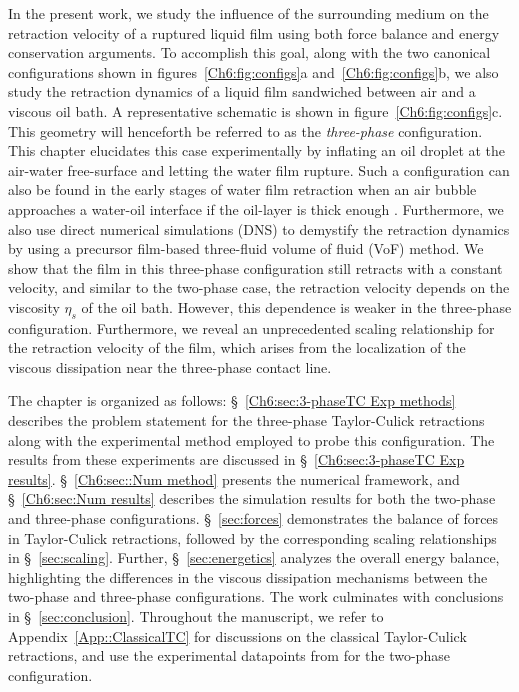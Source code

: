 In the present work, we study the influence of the surrounding medium on the retraction velocity of a ruptured liquid film using both force balance and energy conservation arguments. To accomplish this goal, along with the two canonical configurations shown in figures~\ref{Ch6:fig:configs}a and~\ref{Ch6:fig:configs}b, we also study the retraction dynamics of a liquid film sandwiched between air and a viscous oil bath. A representative schematic is shown in figure~\ref{Ch6:fig:configs}c. This geometry will henceforth be referred to as the \emph{three-phase} configuration. This chapter elucidates this case experimentally by inflating an oil droplet at the air-water free-surface and letting the water film rupture. Such a configuration can also be found in the early stages of water film retraction when an air bubble approaches a water-oil interface if the oil-layer is thick enough \citep{feng2014nanoemulsions, feng_muradoglu_kim_ault_stone_2016}. Furthermore, we also use direct numerical simulations (DNS) to demystify the retraction dynamics by using a precursor film-based three-fluid volume of fluid (VoF) method. We show that the film in this three-phase configuration still retracts with a constant velocity, and similar to the two-phase case, the retraction velocity depends on the viscosity $\eta_{s}$ of the oil bath. However, this dependence is weaker in the three-phase configuration. Furthermore, we reveal an unprecedented scaling relationship for the retraction velocity of the film, which arises from the localization of the viscous dissipation near the three-phase contact line. 

The chapter is organized as follows: \S~\ref{Ch6:sec:3-phaseTC Exp methods} describes the problem statement for the three-phase Taylor-Culick retractions along with the experimental method employed to probe this configuration. The results from these experiments are discussed in \S~\ref{Ch6:sec:3-phaseTC Exp results}. \S~\ref{Ch6:sec::Num method} presents the numerical framework, and \S~\ref{Ch6:sec:Num results} describes the simulation results for both the two-phase and three-phase configurations. \S~\ref{sec:forces} demonstrates the balance of forces in Taylor-Culick retractions, followed by the corresponding scaling relationships in \S~\ref{sec:scaling}. Further, \S~\ref{sec:energetics} analyzes the overall energy balance, highlighting the differences in the viscous dissipation mechanisms between the two-phase and three-phase configurations. The work culminates with conclusions in \S~\ref{sec:conclusion}. Throughout the manuscript, we refer to Appendix~\ref{App::ClassicalTC} for discussions on the classical Taylor-Culick retractions, and use the experimental datapoints from \citet{reyssat-2006-epl} for the two-phase configuration.

